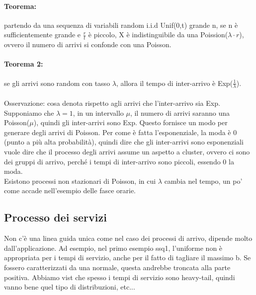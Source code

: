 \documentclass{article}
\begin{document}
\paragraph{Teorema: }partendo da una sequenza di variabili random i.i.d Unif(0,t) grande n, se n è sufficientemente grande e $\frac{r}{t}$ è piccolo, X è indistinguibile da una Poission($\lambda \cdot r$), ovvero il numero di arrivi si confonde con una Poisson.
\paragraph{Teorema 2:}se gli arrivi sono random con tasso $\lambda$, allora il tempo di inter-arrivo è Exp($\frac{1}{\lambda}$).\\\\ Osservazione: cosa denota rispetto agli arrivi che l'inter-arrivo sia Exp. Supponiamo che $\lambda = 1$, in un intervallo $\mu$, il numero di arrivi saranno una Poisson($\mu$), quindi gli inter-arrivi sono Exp. Questo fornisce un modo per generare degli arrivi di Poisson. Per come è fatta l'esponenziale, la moda è 0 (punto a più alta probabilità), quindi dire che gli inter-arrivi sono esponenziali vuole dire che il processo degli arrivi assume un aspetto a cluster, ovvero ci sono dei gruppi di arrivo, perché i tempi di inter-arrivo sono piccoli, essendo 0 la moda.\\ Esistono processi non stazionari di Poisson, in cui $\lambda$ cambia nel tempo, un po' come accade nell'esempio delle fasce orarie.
\subsection{Processo dei servizi}
Non c'è una linea guida unica come nel caso dei processi di arrivo, dipende molto dall'applicazione. Ad esempio, nel primo esempio ssq1, l'uniforme non è appropriata per i tempi di servizio, anche per il fatto di tagliare il massimo b. Se fossero caratterizzati da una normale, questa andrebbe troncata alla parte positiva. Abbiamo vist che spesso i tempi di servizio sono heavy-tail, quindi vanno bene quel tipo di distribuzioni, etc...
\end{document}
